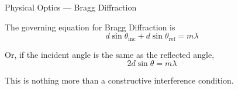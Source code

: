 \documentclass{beamer}
\begin{document}
\begin{frame}{Physical Optics --- Bragg Diffraction}

The governing equation for Bragg Diffraction is
\begin{equation*}
    d\sin{\theta_{\text{inc}}} + d\sin{\theta_{\text{ref}}} = m \lambda
\end{equation*}

Or, if the incident angle is the same as the reflected angle,
\begin{equation*}
    2d\sin{\theta} = m \lambda
\end{equation*}

This is nothing more than a constructive interference condition.

\end{frame}
\end{document}
